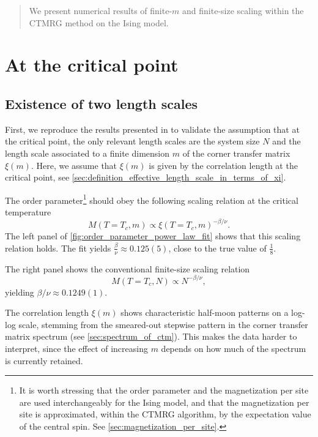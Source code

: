 \begin{abstract}
We present numerical results of finite-$m$ and finite-size scaling within the CTMRG method on the
Ising model.
\end{abstract}

\section{At the critical point}

\subsection{Existence of two length scales}

First, we reproduce the results presented in \cite{nishino1996numerical} to validate the assumption that at the critical
point, the only relevant length scales are the system size $N$ and the length scale associated to a finite dimension $m$
of the corner transfer matrix $\xi(m)$.
Here, we assume that $\xi(m)$ is given by the correlation length at the critical point,
see \autoref{sec:definition_effective_length_scale_in_terms_of_xi}.

The order parameter\footnote{It is worth stressing that the order parameter and the magnetization per site are used
interchangeably for the Ising model, and that the magnetization per site is approximated,
within the CTMRG algorithm, by the expectation value of the central spin.
See \autoref{sec:magnetization_per_site}.} should obey the following scaling relation at the critical temperature
\begin{equation}\label{eq:order_param_scaling_relation_finite_m}
  M(T = T_c,m) \propto \xi(T = T_c, m)^{-\beta/\nu}.
\end{equation}
The left panel of \autoref{fig:order_parameter_power_law_fit} shows that this scaling relation holds.
The fit yields $\frac{\beta}{\nu} \approx 0.125(5)$, close to the true value of $\frac{1}{8}$.

The right panel shows the conventional finite-size scaling relation
\begin{equation}\label{eq:order_param_scaling_relation_finite_N}
  M(T = T_c, N) \propto N^{-\beta/\nu},
\end{equation}
yielding $\beta/\nu \approx 0.1249(1)$.

The correlation length $\xi(m)$ shows characteristic half-moon patterns on a log-log scale,
stemming from the smeared-out stepwise pattern in the corner transfer matrix spectrum (see
\autoref{sec:spectrum_of_ctm}).
This makes the data harder to interpret, since the effect of increasing $m$ depends on how much of the spectrum is
currently retained.

